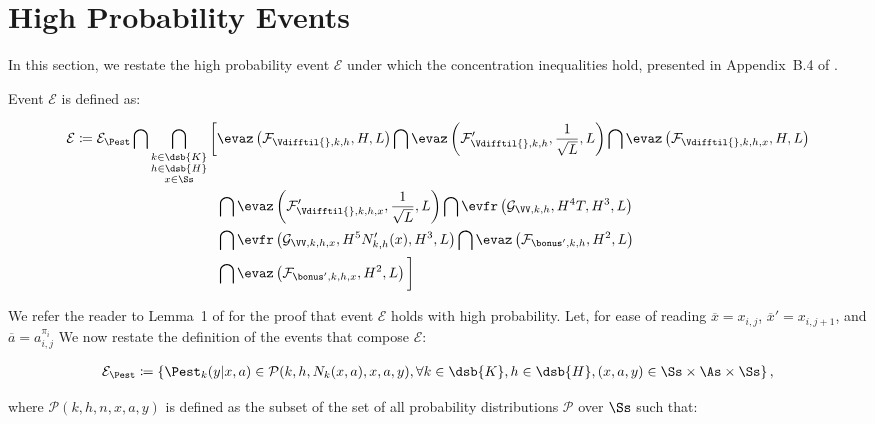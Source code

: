 \section{High Probability Events}
\label{apx:event}

In this section, we restate the high probability event $\mathcal{E}$ under which the concentration inequalities hold, presented in Appendix~B.4 of \citep{azar2017minimax}.

Event $\mathcal{E}$ is defined as:

\begin{align*}
    \mathcal{E} \coloneqq \mathcal{E}_{\Pest} \bigcap \bigcap_{\substack{k \in \dsb{K} \\ h \in \dsb{H} \\ x \in \Ss}} \bigg[ 
    & \evaz\left( \mathcal{F}_{\Vdifftil{}, k, h}, H, L \right) 
    \bigcap \evaz\left( \mathcal{F}'_{\Vdifftil{}, k, h}, \frac{1}{\sqrt{L}}, L \right)
    \bigcap \evaz\left( \mathcal{F}_{\Vdifftil{}, k, h, x}, H, L \right) \\
    & \bigcap \evaz\left( \mathcal{F}'_{\Vdifftil{}, k, h, x}, \frac{1}{\sqrt{L}}, L \right)
    \bigcap \evfr\left( \mathcal{G}_{\VV, k, h}, H^4T, H^3, L \right) \\
    & \bigcap \evfr\left( \mathcal{G}_{\VV, k, h, x}, H^5 N'_{k,h}(x), H^3, L \right)
    \bigcap \evaz\left( \mathcal{F}_{\bonus', k, h}, H^2, L \right) \\
    & \bigcap \evaz\left( \mathcal{F}_{\bonus', k, h, x}, H^2, L \right)
    \bigg]
\end{align*}

We refer the reader to Lemma~1 of \citep{azar2017minimax} for the proof that event $\mathcal{E}$ holds with high probability.
Let, for ease of reading $\overline{x} = x_{i,j}$, $\overline{x}' = x_{i,j+1}$, and $\overline{a}=a_{i,j}^{\pi_i}$
We now restate the definition of the events that compose $\mathcal{E}$:

\begin{align*}
    \mathcal{E}_{\Pest} \coloneqq \left\{ \Pest_k (y|x,a) \in \mathcal{P}(k,h,N_k(x,a),x,a,y), \forall k \in \dsb{K}, h \in \dsb{H}, (x,a,y)\in\Ss\times\As\times\Ss \right\},
\end{align*}

where $\mathcal{P}(k, h, n,x,a,y)$ is defined as the subset of the set of all probability distributions $\mathcal{P}$ over $\Ss$ such that:

